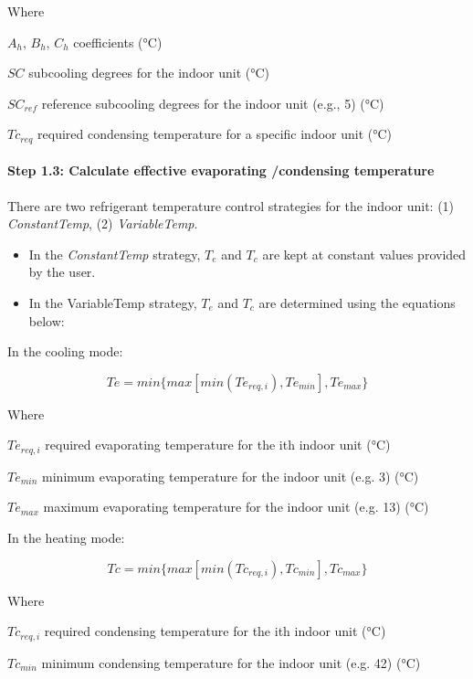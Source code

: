 Where

$A_h$, $B_h$, $C_h$ coefficients (°C)

$SC$ subcooling degrees for the indoor unit (°C) 

$SC_{ref}$ reference subcooling degrees for the indoor unit (e.g., 5) (°C)

$Tc_{req}$ required condensing temperature for a specific indoor unit (°C)

\paragraph{Step 1.3: Calculate effective evaporating /condensing temperature}\label{step-1.3-calculate-effective-evaporating-condensing-temperature}

There are two refrigerant temperature control strategies for the indoor unit: (1) \emph{ConstantTemp}, (2) \emph{VariableTemp}.

\begin{itemize}
  \item
    In the \emph{ConstantTemp} strategy, $T_e$ and $T_c$ are kept at constant values provided by the user.

 \item
   In the {VariableTemp} strategy, $T_e$ and $T_c$ are determined using the equations below:
\end{itemize}

In the cooling mode:

\begin{equation}
  Te = min \{ max [ min(Te_{req,i}), Te_{min}], Te_{max}\}
\end{equation}
 
Where

$Te_{req,i}$ required evaporating temperature for the ith indoor unit (°C)

$Te_{min}$ minimum evaporating temperature for the indoor unit (e.g. 3) (°C)

$Te_{max}$ maximum evaporating temperature for the indoor unit (e.g. 13) (°C)

In the heating mode:

\begin{equation}
  Tc = min \{ max[min(Tc_{req,i}),Tc_{min}],Tc_{max} \}
\end{equation}
 
Where

$Tc_{req,i}$ required condensing temperature for the ith indoor unit (°C)

$Tc_{min}$ minimum condensing temperature for the indoor unit (e.g. 42) (°C)

